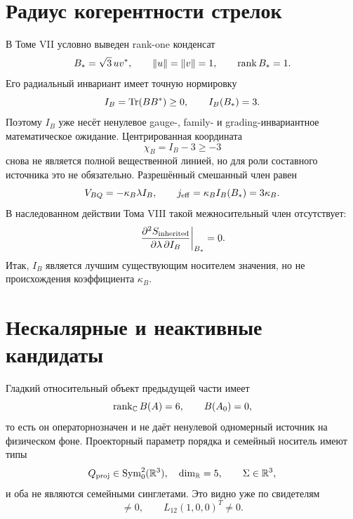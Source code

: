 \section{Радиус когерентности стрелок}

В Томе VII условно выведен rank-one конденсат
\begin{equation}
 B_*=\sqrt3\,uv^*,
 \qquad \|u\|=\|v\|=1,
 \qquad \operatorname{rank} B_*=1.
 \label{eq:v8-existing-scalar-coherence-condensate}
\end{equation}
Его радиальный инвариант имеет точную нормировку
\begin{equation}
 I_B=\operatorname{Tr}(BB^*)\ge0,
 \qquad
 I_B(B_*)=3.
 \label{eq:v8-existing-scalar-coherence-radius}
\end{equation}
Поэтому $I_B$ уже несёт ненулевое gauge-, family- и grading-инвариантное
математическое ожидание. Центрированная координата
\begin{equation}
 \chi_B=I_B-3\ge-3
 \label{eq:v8-existing-scalar-coherence-centered-domain}
\end{equation}
снова не является полной вещественной линией, но для роли составного
источника это не обязательно. Разрешённый смешанный член равен
\begin{equation}
 V_{BQ}=-\kappa_B\lambda I_B,
 \qquad
 j_{\rm eff}=\kappa_B I_B(B_*)=3\kappa_B.
 \label{eq:v8-existing-scalar-coherence-q-portal}
\end{equation}
В наследованном действии Тома VIII такой межносительный член отсутствует:
\begin{equation}
 \left.
 \frac{\partial^2S_{\rm inherited}}
 {\partial\lambda\,\partial I_B}
 \right|_{B_*}=0.
 \label{eq:v8-existing-scalar-coherence-portal-absent}
\end{equation}
Итак, $I_B$ является лучшим существующим носителем значения, но не
происхождения коэффициента $\kappa_B$.

\section{Нескалярные и неактивные кандидаты}

Гладкий относительный объект предыдущей части имеет
\begin{equation}
 \operatorname{rank}_{\mathbb C}B(A)=6,
 \qquad B(A_0)=0,
 \label{eq:v8-existing-scalar-smooth-order-type}
\end{equation}
то есть он операторнозначен и не даёт ненулевой одномерный источник на
физическом фоне. Проекторный параметр порядка и семейный носитель имеют
типы
\begin{equation}
 Q_{\rm proj}\in\operatorname{Sym}^2_0(\mathbb R^3),
 \quad \dim_{\mathbb R}=5,
 \qquad
 \Sigma\in\mathbb R^3,
 \label{eq:v8-existing-scalar-family-nonsinglet-types}
\end{equation}
и оба не являются семейными синглетами. Это видно уже по свидетелям
\begin{equation}
 [L_{12},\operatorname{diag}(1,-1,0)]\ne0,
 \qquad
 L_{12}(1,0,0)^T\ne0.
 \label{eq:v8-existing-scalar-family-action-witnesses}
\end{equation}

